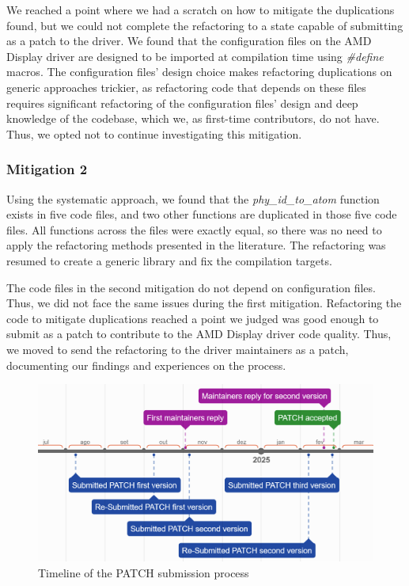 \documentclass[10pt,conference]{IEEEtran}
\begin{document}
We reached a point where we had a scratch on how to mitigate the duplications found, but we could not complete the refactoring to a state capable of submitting as a patch to the driver. We found that the configuration files on the AMD Display driver are designed to be imported at compilation time using \textit{\#define} macros. The configuration files' design choice makes refactoring duplications on generic approaches trickier, as refactoring code that depends on these files requires significant refactoring of the configuration files' design and deep knowledge of the codebase, which we, as first-time contributors, do not have. Thus, we opted not to continue investigating this mitigation.

\subsubsection{Mitigation 2}

Using the systematic approach, we found that the \textit{phy\_id\_to\_atom} function exists in five code files, and two other functions are duplicated 
in those five code files. All functions across the files were exactly equal, 
so there was no need to apply the refactoring methods presented in the literature. 
The refactoring was resumed to create a generic library and fix the compilation targets.

The code files in the second mitigation do not depend on configuration files. Thus, 
we did not face the same issues during the first mitigation. Refactoring the code 
to mitigate duplications reached a point we judged was good enough to submit as a 
patch to contribute to the AMD Display driver code quality. Thus, we moved to send 
the refactoring to the driver maintainers as a patch, documenting our findings and experiences 
on the process.

\begin{figure}[ht]
\centering
\includegraphics[scale=0.325]{timeline_patch}
\caption{Timeline of the PATCH submission process}
\label{fig:timeline}
\end{figure}
\end{document}
